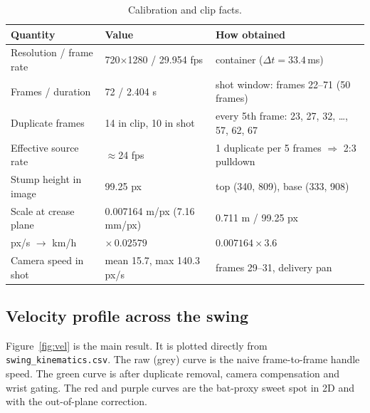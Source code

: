 \documentclass[11pt,a4paper]{article}
\begin{document}
\begin{table}[H]
\centering\small
\caption{Calibration and clip facts.}
\label{tab:calib}
\begin{tabular}{@{}lll@{}}
\toprule
\textbf{Quantity} & \textbf{Value} & \textbf{How obtained} \\
\midrule
Resolution / frame rate & 720$\times$1280 / 29.954 fps & container ($\Delta t = 33.4$\,ms) \\
Frames / duration & 72 / 2.404 s & shot window: frames 22--71 (50 frames) \\
Duplicate frames & 14 in clip, 10 in shot & every 5th frame: 23, 27, 32, \dots, 57, 62, 67 \\
Effective source rate & $\approx$24 fps & 1 duplicate per 5 frames $\Rightarrow$ 2:3 pulldown \\
Stump height in image & 99.25 px & top (340, 809), base (333, 908) \\
Scale at crease plane & 0.007164 m/px (7.16 mm/px) & 0.711 m / 99.25 px \\
px/s $\to$ km/h & $\times\,0.02579$ & $0.007164 \times 3.6$ \\
Camera speed in shot & mean 15.7, max 140.3 px/s & frames 29--31, delivery pan \\
\bottomrule
\end{tabular}
\end{table}

\subsection{Velocity profile across the swing}
Figure~\ref{fig:vel} is the main result. It is plotted directly from \texttt{swing\_kinematics.csv}. The raw (grey) curve is the naive frame-to-frame handle speed. The green curve is after duplicate removal, camera compensation and wrist gating. The red and purple curves are the bat-proxy sweet spot in 2D and with the out-of-plane correction.
\end{document}
